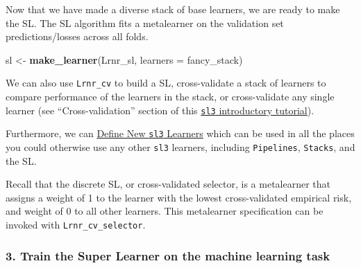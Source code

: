 \documentclass[12pt, krantz2,]{krantz}
\newenvironment{Shaded}{\begin{snugshade}}{\end{snugshade}}
\newcommand{\DataTypeTok}[1]{\textcolor[rgb]{0.27,0.27,0.27}{#1}}
\newcommand{\KeywordTok}[1]{\textcolor[rgb]{0.27,0.27,0.27}{\textbf{#1}}}
\newcommand{\NormalTok}[1]{#1}
\newcommand{\OperatorTok}[1]{\textcolor[rgb]{0.43,0.43,0.43}{\textbf{#1}}}
\newcommand{\StringTok}[1]{\textcolor[rgb]{0.5,0.5,0.5}{#1}}
\theoremstyle{definition}
\theoremstyle{definition}
\theoremstyle{definition}
\newcommand{\1}{\mathbbm{1}}
\begin{document}
Now that we have made a diverse stack of base learners, we are ready to make
the SL. The SL algorithm fits a metalearner on the validation set
predictions/losses across all folds.

\begin{Shaded}
\begin{Highlighting}[]
\NormalTok{sl <-}\StringTok{ }\KeywordTok{make_learner}\NormalTok{(Lrnr_sl, }\DataTypeTok{learners =}\NormalTok{ fancy_stack)}
\end{Highlighting}
\end{Shaded}

We can also use \texttt{Lrnr\_cv} to build a SL, cross-validate a stack of
learners to compare performance of the learners in the stack, or cross-validate
any single learner (see ``Cross-validation'' section of this \href{https://tlverse.org/sl3/articles/intro_sl3.html}{\texttt{sl3}
introductory tutorial}).

Furthermore, we can \href{https://tlverse.org/sl3/articles/custom_lrnrs.html}{Define New \texttt{sl3}
Learners} which can be used
in all the places you could otherwise use any other \texttt{sl3} learners, including
\texttt{Pipelines}, \texttt{Stacks}, and the SL.

Recall that the discrete SL, or cross-validated selector, is a metalearner that
assigns a weight of 1 to the learner with the lowest cross-validated empirical
risk, and weight of 0 to all other learners. This metalearner specification can
be invoked with \texttt{Lrnr\_cv\_selector}.

\begin{Shaded}
\end{Shaded}

\hypertarget{train-the-super-learner-on-the-machine-learning-task}{%
\subsubsection*{3. Train the Super Learner on the machine learning task}\label{train-the-super-learner-on-the-machine-learning-task}}
\end{document}
